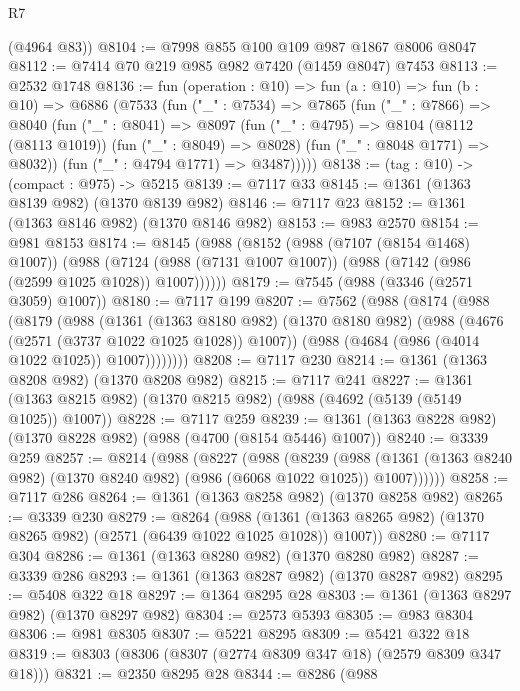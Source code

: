 \begin{lexlean}{R7}
\begin{coremodule}
      (@4964 @83))
@8104 := @7998 @855 @100 @109 @987 @1867 @8006 @8047
@8112 := @7414 @70 @219 @985 @982 @7420 (@1459 @8047) @7453
@8113 := @2532 @1748
@8136 := fun (operation : @10) =>
  fun (a : @10) =>
  fun (b : @10) =>
  @6886
    (@7533
      (fun ("_" : @7534) =>
      @7865
        (fun ("_" : @7866) =>
        @8040
          (fun ("_" : @8041) =>
          @8097
            (fun ("_" : @4795) =>
            @8104
              (@8112 (@8113 @1019))
              (fun ("_" : @8049) => @8028)
              (fun ("_" : @8048 @1771) => @8032))
            (fun ("_" : @4794 @1771) => @3487)))))
@8138 := (tag : @10) -> (compact : @975) -> @5215
@8139 := @7117 @33
@8145 := @1361 (@1363 @8139 @982) (@1370 @8139 @982)
@8146 := @7117 @23
@8152 := @1361 (@1363 @8146 @982) (@1370 @8146 @982)
@8153 := @983 @2570
@8154 := @981 @8153
@8174 := @8145
    (@988
      (@8152
        (@988 (@7107 (@8154 @1468) @1007))
        (@988 (@7124 (@988 (@7131 @1007 @1007)) (@988 (@7142 (@986 (@2599 @1025 @1028)) @1007))))))
@8179 := @7545 (@988 (@3346 (@2571 @3059) @1007))
@8180 := @7117 @199
@8207 := @7562
    (@988
      (@8174
        (@988
          (@8179
            (@988
              (@1361
                (@1363 @8180 @982)
                (@1370 @8180 @982)
                (@988 (@4676 (@2571 (@3737 @1022 @1025 @1028)) @1007))
                (@988 (@4684 (@986 (@4014 @1022 @1025)) @1007))))))))
@8208 := @7117 @230
@8214 := @1361 (@1363 @8208 @982) (@1370 @8208 @982)
@8215 := @7117 @241
@8227 := @1361 (@1363 @8215 @982) (@1370 @8215 @982) (@988 (@4692 (@5139 (@5149 @1025)) @1007))
@8228 := @7117 @259
@8239 := @1361 (@1363 @8228 @982) (@1370 @8228 @982) (@988 (@4700 (@8154 @5446) @1007))
@8240 := @3339 @259
@8257 := @8214
    (@988
      (@8227
        (@988
          (@8239
            (@988
              (@1361 (@1363 @8240 @982) (@1370 @8240 @982) (@986 (@6068 @1022 @1025)) @1007))))))
@8258 := @7117 @286
@8264 := @1361 (@1363 @8258 @982) (@1370 @8258 @982)
@8265 := @3339 @230
@8279 := @8264
    (@988 (@1361 (@1363 @8265 @982) (@1370 @8265 @982) (@2571 (@6439 @1022 @1025 @1028)) @1007))
@8280 := @7117 @304
@8286 := @1361 (@1363 @8280 @982) (@1370 @8280 @982)
@8287 := @3339 @286
@8293 := @1361 (@1363 @8287 @982) (@1370 @8287 @982)
@8295 := @5408 @322 @18
@8297 := @1364 @8295 @28
@8303 := @1361 (@1363 @8297 @982) (@1370 @8297 @982)
@8304 := @2573 @5393
@8305 := @983 @8304
@8306 := @981 @8305
@8307 := @5221 @8295
@8309 := @5421 @322 @18
@8319 := @8303 (@8306 (@8307 (@2774 @8309 @347 @18) (@2579 @8309 @347 @18)))
@8321 := @2350 @8295 @28
@8344 := @8286
    (@988

\end{coremodule}
\end{lexlean}
